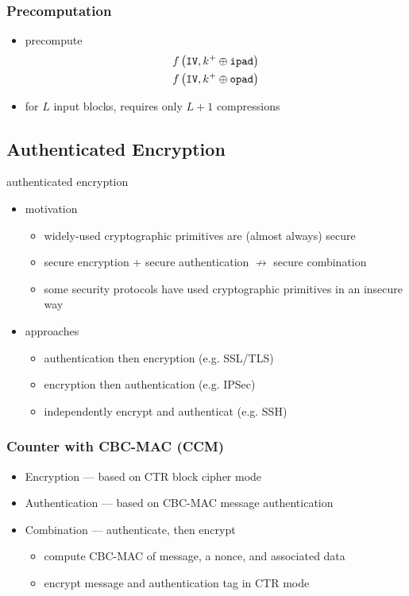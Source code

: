 \documentclass[draft]{article}
\begin{document}
\subsubsection*{Precomputation}
\begin{itemize}[nosep]
    \item precompute
          \begin{align*}
               & f\left(\texttt{IV}, k^+ \oplus \texttt{ipad}\right) \\
               & f\left(\texttt{IV}, k^+ \oplus \texttt{opad}\right)
          \end{align*}
    \item for $L$ input blocks, requires only $L+1$ compressions
\end{itemize}
\subsection{Authenticated Encryption}
\glsdesc{authenticated encryption}
\begin{itemize}[nosep]
    \item motivation
          \begin{itemize}[nosep]
              \item widely-used cryptographic primitives are (almost always) secure
              \item secure encryption + secure authentication $\not\rightarrow$ secure combination
              \item some security protocols have used cryptographic primitives in an insecure way
          \end{itemize}
    \item approaches
          \begin{itemize}[nosep]
              \item authentication then encryption (e.g. SSL/TLS)
              \item encryption then authentication (e.g. IPSec)
              \item independently encrypt and authenticat (e.g. SSH)
          \end{itemize}
\end{itemize}
\subsubsection{Counter with CBC-MAC (CCM)}
\begin{itemize}[nosep]
    \item Encryption --- based on CTR block cipher mode
    \item Authentication --- based on CBC-MAC message authentication
    \item Combination --- authenticate, then encrypt
          \begin{itemize}[nosep]
              \item compute CBC-MAC of message, a nonce, and associated data
              \item encrypt message and authentication tag in CTR mode
          \end{itemize}
\end{itemize}
\end{document}
